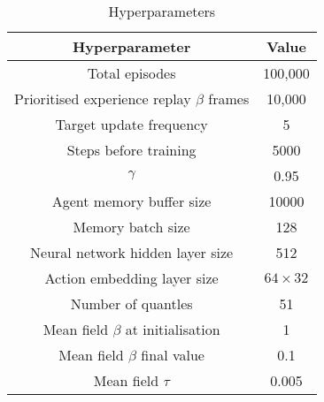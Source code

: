 \begin{table}[!htb]
    \begin{center}
        \caption{Hyperparameters}
\begin{tabular}{||c | c||}
    \hline
    Hyperparameter & Value\\
    \hline\hline
    Total episodes  & 100,000  \\ 
    \hline
    Prioritised experience replay $\beta$ frames & 10,000  \\
    \hline
    Target update frequency & 5 \\
    \hline
    Steps before training & 5000  \\
    \hline
    $\gamma$ & 0.95 \\
    \hline
    Agent memory buffer size & 10000 \\
    \hline
    Memory batch size & 128 \\
    \hline
    Neural network hidden layer size & 512 \\
    \hline
    Action embedding layer size & $64 \times 32$ \\
    \hline
    Number of quantles & 51 \\
    \hline
    Mean field $\beta$ at initialisation & 1 \\
    \hline
    Mean field $\beta$ final value & 0.1 \\
    \hline
    Mean field $\tau$ & 0.005 \\
    \hline
\end{tabular}
\end{center}
\end{table}
